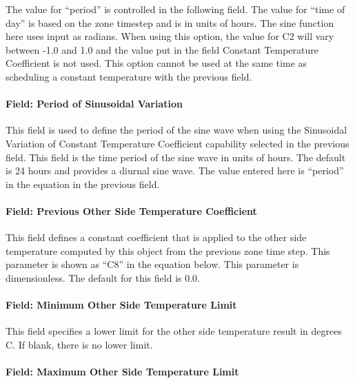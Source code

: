 The value for ``period'' is controlled in the following field. The value for ``time of day'' is based on the zone timestep and is in units of hours. The sine function here uses input as radians. When using this option, the value for C2 will vary between -1.0 and 1.0 and the value put in the field Constant Temperature Coefficient is not used. This option cannot be used at the same time as scheduling a constant temperature with the previous field.

\paragraph{Field: Period of Sinusoidal Variation}\label{field-period-of-sinusoidal-variation}

This field is used to define the period of the sine wave when using the Sinusoidal Variation of Constant Temperature Coefficient capability selected in the previous field. This field is the time period of the sine wave in units of hours. The default is 24 hours and provides a diurnal sine wave. The value entered here is ``period'' in the equation in the previous field.

\paragraph{Field: Previous Other Side Temperature Coefficient}\label{field-previous-other-side-temperature-coefficient}

This field defines a constant coefficient that is applied to the other side temperature computed by this object from the previous zone time step. This parameter is shown as ``C8'' in the equation below. This parameter is dimensionless. The default for this field is 0.0.

\paragraph{Field: Minimum Other Side Temperature Limit}\label{field-minimum-other-side-temperature-limit}

This field specifies a lower limit for the other side temperature result in degrees C. If blank, there is no lower limit.

\paragraph{Field: Maximum Other Side Temperature Limit}\label{field-maximum-other-side-temperature-limit}

